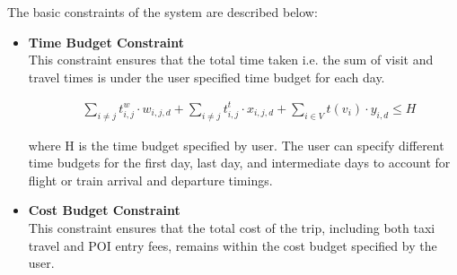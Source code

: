 {The basic constraints of the system are described below:

\begin{itemize}

\item \textbf{Time Budget Constraint}\\
This constraint ensures that the total time taken i.e. the sum of visit and travel times is under the user specified time budget for each day.

\begin{align}
\label{mul_day_9}
    & \sum_{i \ne j} t^{w}_{i,j} \cdot w_{i,j,d}
    + \sum_{i \ne j} t^{t}_{i,j} \cdot x_{i,j,d}
    + \sum_{i \in V} t(v_i) \cdot y_{i,d} \leq H
\end{align}

where H is the time budget specified by user. The user can specify different time budgets for the first day, last day, and intermediate days to account for flight or train arrival and departure timings.
\\[1ex]
\item \textbf{Cost Budget Constraint} \\
 This constraint ensures that the total cost of the trip, including both taxi travel and POI entry fees, remains within the cost budget specified by the user.


\end{itemize}}
